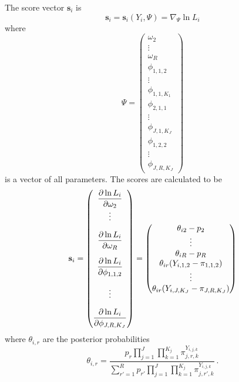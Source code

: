 \documentclass{article}
\begin{document}
The score vector $\mathbf{s}_i$ is
\begin{equation}
    \mathbf{s}_i = \mathbf{s}_i(Y_i, \Psi) = \nabla_\Psi  \ln L_i
\end{equation}
where
\begin{equation}
    \Psi =
    \begin{pmatrix}
        \omega_2 \\
        \vdots \\
        \omega_R \\
        \phi_{1,1,2} \\
        \vdots \\
        \phi_{1,1,K_1} \\
        \phi_{2,1,1} \\
        \vdots \\
        \phi_{J,1,K_J} \\
        \phi_{1,2,2} \\
        \vdots \\
        \phi_{J, R, K_J}
    \end{pmatrix}
\end{equation}
is a vector of all parameters. The scores are calculated to be
\begin{equation}
    \mathbf{s}_i
    =
    \begin{pmatrix}
        \dfrac{\partial \ln L_i}{\partial \omega_2} \\ \vspace{1em}
        \vdots \\ \vspace{1em}
        \dfrac{\partial \ln L_i}{\partial \omega_R} \\ \vspace{1em}
        \dfrac{\partial \ln L_i}{\partial \phi_{1,1,2}} \\ \vspace{1em}
        \vdots \\
        \dfrac{\partial \ln L_i}{\partial \phi_{J,R,K_J}}
    \end{pmatrix}
    =
    \begin{pmatrix}
        \theta_{i2} - p_{2} \\
        \vdots \\
        \theta_{iR} - p_{R} \\
        \theta_{ir}(Y_{i,1,2} - \pi_{1,1,2}) \\
        \vdots \\
        \theta_{ir}(Y_{i,J,K_J} - \pi_{J,R,K_J}) \\
    \end{pmatrix}
\end{equation}
where $\theta_{i,r}$ are the posterior probabilities
\begin{equation}
    \theta_{i,r} = \dfrac{
        p_r \prod_{j=1}^J \prod_{k=1}^{K_j} \pi_{j,r,k}^{Y_{i,j,k}}
    } {
        \sum_{r'=1}^R p_{r'} \prod_{j=1}^J \prod_{k=1}^{K_j} \pi_{j,r',k}^{Y_{i,j,k}}
    }
    \ .
\end{equation}
\end{document}

